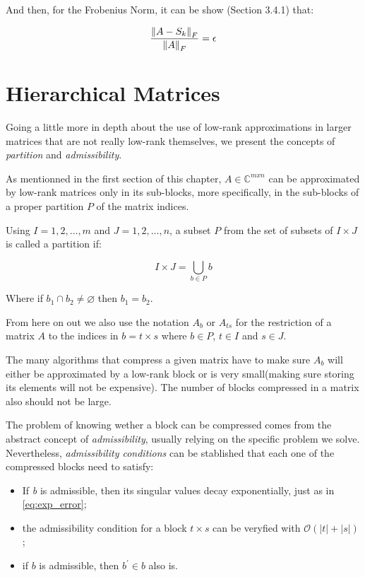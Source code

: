 And then, for the Frobenius Norm, it can be show \cite{trefethen1998numerical}(Section 3.4.1) that:

\begin{equation}\label{eq:stop_ACA}
    \frac{\left\lVert A - S_{k}\right\rVert_{F}}{\left\lVert A\right\rVert_{F}} = \epsilon
\end{equation}

\section{Hierarchical Matrices}

Going a little more in depth about the use of low-rank approximations in larger matrices that are not really low-rank themselves, we present the concepts of \textit{partition} and \textit{admissibility}.

As mentionned in the first section of this chapter, $A \in \mathbb{C}^{m x n} $ can be approximated by low-rank matrices only in its sub-blocks, more specifically, in the sub-blocks of a proper partition $P$ of the matrix indices.

Using $I = {1,2, \dots, m}$ and $J={1,2, \dots, n}$, a subset $P$ from the set of subsets of $I \times J$ is called a partition if:

\begin{equation}\label{eq:union_partition}
    I \times J = \bigcup_{b \in P} b
\end{equation}

Where if $b_{1} \cap b_{2} \neq \varnothing $ then $b_{1} = b_{2}$.

From here on out we also use the notation $A_{b}$ or $A_{ts}$ for the restriction of a matrix $A$ to the indices in $b= t \times s$ where $b \in P$, $t \in I$ and $s \in J$.

The many algorithms that compress a given matrix have to make sure $A_{b}$ will either be approximated by a low-rank block or is very small(making sure storing its elements will not be expensive). The number of blocks compressed in a matrix also should not be large.

The problem of knowing wether a block can be compressed comes from the abstract concept of \textit{admissibility}, usually relying on the specific problem we solve. Nevertheless, \textit{admissibility conditions} can be stablished that each one of the compressed blocks need to satisfy:

\begin{itemize}
    \item If \textit{b} is admissible, then its singular values decay exponentially, just as in \ref{eq:exp_error};
    \item the admissibility condition for a block $t \times s$ can be veryfied with $\mathcal{O}(|t| + |s|)$;
    \item if $b$ is admissible, then $b^{'} \in b$ also is.
\end{itemize}

